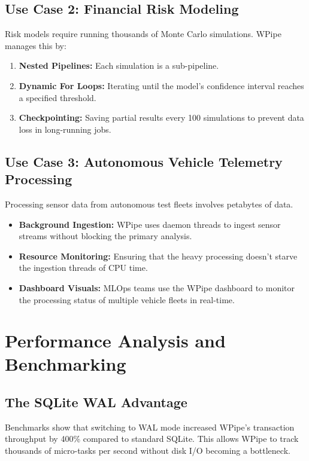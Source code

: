\documentclass[12pt,a4paper]{report}
\begin{document}
\section{Use Case 2: Financial Risk Modeling}
Risk models require running thousands of Monte Carlo simulations. WPipe manages this by:
\begin{enumerate}
    \item \textbf{Nested Pipelines:} Each simulation is a sub-pipeline.
    \item \textbf{Dynamic For Loops:} Iterating until the model's confidence interval reaches a specified threshold.
    \item \textbf{Checkpointing:} Saving partial results every 100 simulations to prevent data loss in long-running jobs.
\end{enumerate}

\cleardoublepage
\section{Use Case 3: Autonomous Vehicle Telemetry Processing}
Processing sensor data from autonomous test fleets involves petabytes of data.
\begin{itemize}
    \item \textbf{Background Ingestion:} WPipe uses daemon threads to ingest sensor streams without blocking the primary analysis.
    \item \textbf{Resource Monitoring:} Ensuring that the heavy processing doesn't starve the ingestion threads of CPU time.
    \item \textbf{Dashboard Visuals:} MLOps teams use the WPipe dashboard to monitor the processing status of multiple vehicle fleets in real-time.
\end{itemize}

\chapter{Performance Analysis and Benchmarking}
\cleardoublepage

\section{The SQLite WAL Advantage}
Benchmarks show that switching to WAL mode increased WPipe's transaction throughput by 400\% compared to standard SQLite. This allows WPipe to track thousands of micro-tasks per second without disk I/O becoming a bottleneck.
\end{document}
